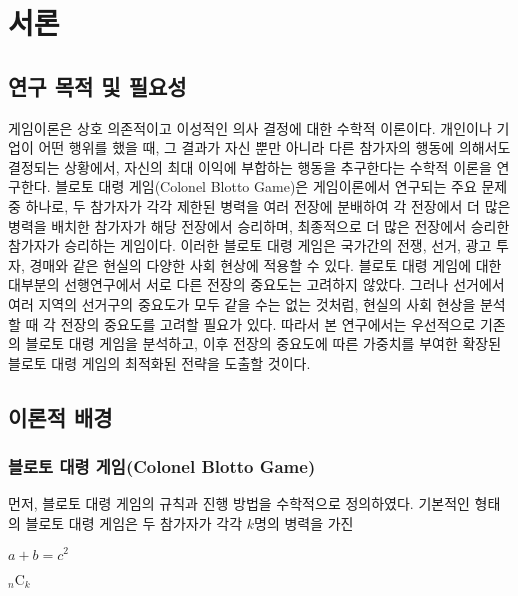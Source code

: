 \section{서론}
\subsection{연구 목적 및 필요성}
게임이론은 상호 의존적이고 이성적인 의사 결정에 대한 수학적 이론이다. 개인이나 기업이 어떤 행위를 했을 때, 그 결과가 자신 뿐만 아니라 다른 참가자의 행동에 의해서도 결정되는 상황에서, 자신의 최대 이익에 부합하는 행동을 추구한다는 수학적 이론을 연구한다.
블로토 대령 게임(Colonel Blotto Game)은 게임이론에서 연구되는 주요 문제 중 하나로, 두 참가자가 각각 제한된 병력을 여러 전장에 분배하여 각 전장에서 더 많은 병력을 배치한 참가자가 해당 전장에서 승리하며, 최종적으로 더 많은 전장에서 승리한 참가자가 승리하는 게임이다. 이러한 블로토 대령 게임은 국가간의 전쟁, 선거, 광고 투자, 경매와 같은 현실의 다양한 사회 현상에 적용할 수 있다.
블로토 대령 게임에 대한 대부분의 선행연구에서 서로 다른 전장의 중요도는 고려하지 않았다. 그러나 선거에서 여러 지역의 선거구의 중요도가 모두 같을 수는 없는 것처럼, 현실의 사회 현상을 분석할 때 각 전장의 중요도를 고려할 필요가 있다.
따라서 본 연구에서는 우선적으로 기존의 블로토 대령 게임을 분석하고, 이후 전장의 중요도에 따른 가중치를 부여한 확장된 블로토 대령 게임의 최적화된 전략을 도출할 것이다.
\subsection{이론적 배경}
\subsubsection{블로토 대령 게임(Colonel Blotto Game)}
먼저, 블로토 대령 게임의 규칙과 진행 방법을 수학적으로 정의하였다. 기본적인 형태의 블로토 대령 게임은 두 참가자가 각각 $k$명의 병력을 가진 


$a + b = c^2$

$_{n}\mathrm{C}_{k}$